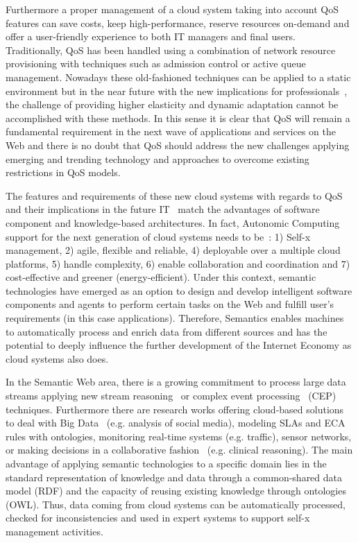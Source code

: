 Furthermore a proper management of a cloud system taking into account QoS 
features can save costs, keep high-performance, reserve resources on-demand and 
offer a user-friendly experience to both IT managers and final users. 
Traditionally, QoS has been handled using a combination of network resource 
provisioning with techniques such as admission control or active queue 
management. Nowadays these old-fashioned techniques can be applied to a static 
environment but in the near future with the new implications for professionals~\cite{DBLP:journals/jucs/Colomo-PalaciosFSS12}, 
the challenge of providing higher elasticity and dynamic adaptation cannot be accomplished with these methods. In this sense it is clear that QoS will remain a fundamental requirement in the next wave of 
applications and services on the Web and there is no doubt that QoS should 
address the new challenges applying emerging and trending technology and 
approaches to overcome existing restrictions in QoS models.

The features and requirements of these new cloud systems with regards 
to QoS~\cite{Pedersen:2011:AMQ:2114495.2115542} and their implications in the future IT~\cite{DBLP:journals/jucs/Colomo-PalaciosFSS12} 
match the advantages of software component and knowledge-based architectures. In fact, Autonomic Computing support for the next generation of cloud systems 
needs to be~\cite{Conejero:2012:MSQ:2357487.2357591,Pedersen:2011:AMQ:2114495.2115542}: 
1) Self-x management, 2) agile, flexible and reliable, 4) deployable over a multiple cloud platforms, 5) handle complexity, 6) enable 
collaboration and coordination and 7) cost-effective and greener 
(energy-efficient). Under this context, semantic technologies have emerged as an 
option to design and develop intelligent software components and agents to 
perform certain tasks on the Web and fulfill user's requirements (in this case 
applications). Therefore, Semantics enables machines to automatically process 
and enrich data from different sources and has the potential to deeply influence 
the further development of the Internet Economy as cloud systems also does.

In the Semantic Web area, there is a growing commitment to process large data streams applying 
new stream reasoning~\cite{Bolles:2008:SSE:1789394.1789438,Barbieri:2010:EEC:1739041.1739095} 
or complex event processing~\cite{Anicic:2011:EUL:1963405.1963495} (CEP) techniques. Furthermore there are research works offering cloud-based 
solutions to deal with Big Data~\cite{Fan:2013:MBD:2481244.2481246} (e.g. analysis of social media), modeling SLAs and ECA rules with ontologies, 
monitoring real-time systems (e.g. traffic), sensor networks, or making decisions in a collaborative fashion~\cite{RodriGuez-GonzaLez:2012:UAP:2350799.2350907} (e.g. clinical reasoning). 
The main advantage of applying semantic technologies to a specific domain lies in the standard representation of knowledge and data through a common-shared data model (RDF) and the 
capacity of reusing existing knowledge through ontologies (OWL). Thus, data coming from cloud systems can be automatically processed, checked for inconsistencies and 
used in expert systems to support self-x management activities.

